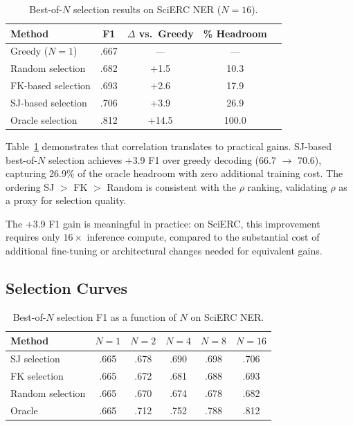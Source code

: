 \documentclass[11pt,a4paper]{article}
\begin{document}
\begin{table}[t]
\centering
\caption{Best-of-$N$ selection results on SciERC NER ($N\!=\!16$).}
\label{tab:adaptive}
\small
\begin{tabular}{lcccc}
\toprule
\textbf{Method} & \textbf{F1} & \textbf{$\Delta$ vs.\ Greedy} & \textbf{\% Headroom} \\
\midrule
Greedy ($N\!=\!1$) & .667 & ---   & --- \\
Random selection    & .682 & +1.5  & 10.3 \\
FK-based selection  & .693 & +2.6  & 17.9 \\
SJ-based selection  & .706 & +3.9  & 26.9 \\
Oracle selection    & .812 & +14.5 & 100.0 \\
\bottomrule
\end{tabular}
\end{table}

Table~\ref{tab:adaptive} demonstrates that correlation translates to practical gains. SJ-based best-of-$N$ selection achieves +3.9 F1 over greedy decoding (66.7 $\to$ 70.6), capturing 26.9\% of the oracle headroom with zero additional training cost. The ordering SJ $>$ FK $>$ Random is consistent with the $\rho$ ranking, validating $\rho$ as a proxy for selection quality.

The +3.9 F1 gain is meaningful in practice: on SciERC, this improvement requires only $16\times$ inference compute, compared to the substantial cost of additional fine-tuning or architectural changes needed for equivalent gains.

\subsection{Selection Curves}
\label{sec:curves}

\begin{table}[t]
\centering
\caption{Best-of-$N$ selection F1 as a function of $N$ on SciERC NER.}
\label{tab:selection_curves}
\small
\begin{tabular}{lccccc}
\toprule
\textbf{Method} & $N\!=\!1$ & $N\!=\!2$ & $N\!=\!4$ & $N\!=\!8$ & $N\!=\!16$ \\
\midrule
SJ selection     & .665 & .678 & .690 & .698 & .706 \\
FK selection     & .665 & .672 & .681 & .688 & .693 \\
Random selection & .665 & .670 & .674 & .678 & .682 \\
Oracle           & .665 & .712 & .752 & .788 & .812 \\
\bottomrule
\end{tabular}
\end{table}
\end{document}
